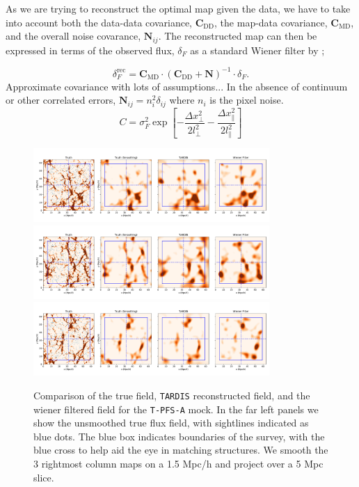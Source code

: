 \documentclass[usenatbib,onecolumn]{mnras}
\begin{document}
As we are trying to reconstruct the optimal map given the data, we have to take into account both the data-data covariance, $\textbf{C}_{\textrm{DD}}$, the map-data covariance, $\textbf{C}_{\textrm{MD}}$, and the overall noise covarance, $\textbf{N}_{ij}$. The reconstructed map can then be expressed in terms of the observed flux, $\delta_F$ as a standard Wiener filter by ;

\begin{equation}
\delta_F^{\textrm{rec}} = \textbf{C}_{\textrm{MD}} \cdot
(\textbf{C}_{\textrm{DD}} + \textbf{N})^{-1} \cdot \delta_F.
\label{eqn:wiener}
\end{equation}
Approximate covariance with lots of assumptions... In the absence of continuum or other correlated errors, $\textbf{N}_{ij}
= n_i^2 \delta_{ij}$ where $n_i$ is the pixel noise.
\begin{equation}
C = \sigma_F^2 \exp{\left[-\frac{\Delta x_{\perp}^2}{2 l_{\perp}^2}
- \frac{\Delta x_{\parallel}^2}{2 l_{\parallel}^2}
\right]}
\label{eqn:covariance}
\end{equation}




\begin{figure}

  \centering  \includegraphics[trim=0cm 0cm 0cm 0cm,width=0.80\textwidth]{./figs_treepm/wf_comparison/wf_compare_pfs14.pdf}
  \centering  \includegraphics[trim=0cm 0cm 0cm 0cm,width=0.80\textwidth]{./figs_treepm/wf_comparison/wf_compare_pfs64.pdf}
  \centering  \includegraphics[trim=0cm 0cm 0cm 0cm,width=0.80\textwidth]{./figs_treepm/wf_comparison/wf_compare_pfs114.pdf}
    \caption{Comparison of the true field, \texttt{TARDIS} reconstructed field, and the wiener filtered field for the \texttt{T-PFS-A} mock. In the far left panels we show the unsmoothed true flux field, with sightlines indicated as blue dots. The blue box indicates boundaries of the survey, with the blue cross to help aid the eye in matching structures. We smooth the 3 rightmost column maps on a 1.5 Mpc/h and project over a 5 Mpc slice.} 
    \label{fig_wfcompare}
\end{figure}




%

\end{document}
